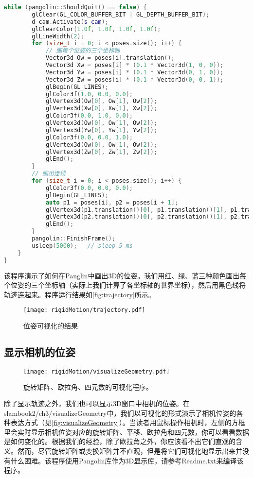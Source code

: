 \begin{lstlisting}[language=c++,caption=slambook2/ch3/examples/plotTrajectory.cpp]
    while (pangolin::ShouldQuit() == false) {
        glClear(GL_COLOR_BUFFER_BIT | GL_DEPTH_BUFFER_BIT);
        d_cam.Activate(s_cam);
        glClearColor(1.0f, 1.0f, 1.0f, 1.0f);
        glLineWidth(2);
        for (size_t i = 0; i < poses.size(); i++) {
            // 画每个位姿的三个坐标轴
            Vector3d Ow = poses[i].translation();
            Vector3d Xw = poses[i] * (0.1 * Vector3d(1, 0, 0));
            Vector3d Yw = poses[i] * (0.1 * Vector3d(0, 1, 0));
            Vector3d Zw = poses[i] * (0.1 * Vector3d(0, 0, 1));
            glBegin(GL_LINES);
            glColor3f(1.0, 0.0, 0.0);
            glVertex3d(Ow[0], Ow[1], Ow[2]);
            glVertex3d(Xw[0], Xw[1], Xw[2]);
            glColor3f(0.0, 1.0, 0.0);
            glVertex3d(Ow[0], Ow[1], Ow[2]);
            glVertex3d(Yw[0], Yw[1], Yw[2]);
            glColor3f(0.0, 0.0, 1.0);
            glVertex3d(Ow[0], Ow[1], Ow[2]);
            glVertex3d(Zw[0], Zw[1], Zw[2]);
            glEnd();
        }
        // 画出连线
        for (size_t i = 0; i < poses.size(); i++) {
            glColor3f(0.0, 0.0, 0.0);
            glBegin(GL_LINES);
            auto p1 = poses[i], p2 = poses[i + 1];
            glVertex3d(p1.translation()[0], p1.translation()[1], p1.translation()[2]);
            glVertex3d(p2.translation()[0], p2.translation()[1], p2.translation()[2]);
            glEnd();
        }
        pangolin::FinishFrame();
        usleep(5000);   // sleep 5 ms
    }
}
\end{lstlisting}

该程序演示了如何在Panglin中画出3D的位姿。我们用红、绿、蓝三种颜色画出每个位姿的三个坐标轴（实际上我们计算了各坐标轴的世界坐标），然后用黑色线将轨迹连起来。程序运行结果如\autoref{fig:trajectory}所示。

\begin{figure}[!htp]
    \centering
    \texttt{[image: rigidMotion/trajectory.pdf]}
    \caption{位姿可视化的结果}
    \label{fig:trajectory}
\end{figure}

\subsection{显示相机的位姿}
\begin{figure}[!htp]
    \centering
    \texttt{[image: rigidMotion/visualizeGeometry.pdf]}
    \caption{旋转矩阵、欧拉角、四元数的可视化程序。}
    \label{fig:visualizeGeometry}
\end{figure}
除了显示轨迹之外，我们也可以显示3D窗口中相机的位姿。在slambook2/ch3/visualizeGeometry中，我们以可视化的形式演示了相机位姿的各种表达方式（见\autoref{fig:visualizeGeometry}）。当读者用鼠标操作相机时，左侧的方框里会实时显示相机位姿对应的旋转矩阵、平移、欧拉角和四元数，你可以看看数据是如何变化的。根据我们的经验，除了欧拉角之外，你应该看不出它们直观的含义。然而，尽管旋转矩阵或变换矩阵并不直观，但是将它们可视化地显示出来并没有什么困难。该程序使用Pangolin库作为3D显示库，请参考Readme.txt来编译该程序。

